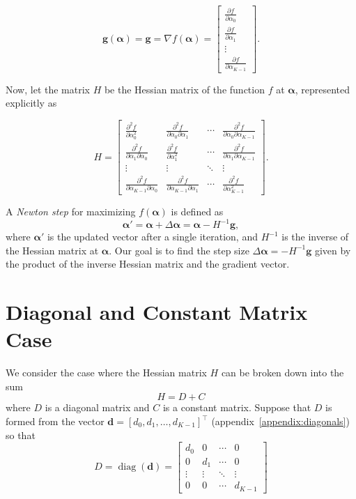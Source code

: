 \documentclass[twoside]{article}
\begin{document}
\renewcommand*{\arraystretch}{2}
\[
    \boldsymbol{g}(\boldsymbol{\alpha}) = \boldsymbol{g} = \nabla f(\boldsymbol{\alpha}) =\begin{bmatrix}
        \frac{\partial f}{\partial \alpha_0} \\
        \frac{\partial f}{\partial \alpha_1} \\
        \vdots \\
        \frac{\partial f}{\partial \alpha_{K-1}}
    \end{bmatrix}.
\]

Now, let the matrix $H$ be the Hessian matrix of the function $f$ at $\boldsymbol{\alpha}$, represented explicitly as

\renewcommand*{\arraystretch}{2}
\[
    H =
    \begin{bmatrix}
        \frac{\partial^2 f}{\partial \alpha_0^2} & \frac{\partial^2 f}{\partial \alpha_0 \partial \alpha_1} & \cdots & \frac{\partial^2 f}{\partial \alpha_0 \partial \alpha_{K-1}} \\
        \frac{\partial^2 f}{\partial \alpha_1 \partial \alpha_0} & \frac{\partial^2 f}{\partial \alpha_1^2} & \cdots & \frac{\partial^2 f}{\partial \alpha_1 \partial \alpha_{K-1}} \\
        \vdots & \vdots & \ddots & \vdots \\
        \frac{\partial^2 f}{\partial \alpha_{K-1} \partial \alpha_0} & \frac{\partial^2 f}{\partial \alpha_{K-1} \partial \alpha_1} & \cdots & \frac{\partial^2 f}{\partial \alpha_{K-1}^2}
    \end{bmatrix}.
\]

A \textit{Newton step} for maximizing $f(\boldsymbol{\alpha})$ is defined as
\[
    \boldsymbol{\alpha'} = \boldsymbol{\alpha} + \Delta \boldsymbol{\alpha} = \boldsymbol{\alpha} - H^{-1}\boldsymbol{g},
\]
where $\boldsymbol{\alpha'}$ is the updated vector after a single iteration, and $H^{-1}$ is the inverse of the Hessian matrix at $\boldsymbol{\alpha}$. Our goal is to find the step size $\Delta \boldsymbol{\alpha} = -H^{-1}\boldsymbol{g}$ given by the product of the inverse Hessian matrix and the gradient vector.

\section{Diagonal and Constant Matrix Case}

We consider the case where the Hessian matrix $H$ can be broken down into the sum \[H = D + C\] where $D$ is a diagonal matrix and $C$ is a constant matrix. Suppose that $D$ is formed from the vector $\boldsymbol{d} = [d_0, d_1, \dots, d_{K-1}]^\top$ (appendix~\ref{appendix:diagonals}) so that
\renewcommand*{\arraystretch}{1.5}
\[
    D = \operatorname{diag}(\boldsymbol{d}) =
    \begin{bmatrix}
        d_0 & 0 & \cdots & 0 \\
        0 & d_1 & \cdots & 0 \\
        \vdots & \vdots & \ddots & \vdots \\
        0 & 0 & \cdots & d_{K-1}
    \end{bmatrix}
\]
\end{document}
